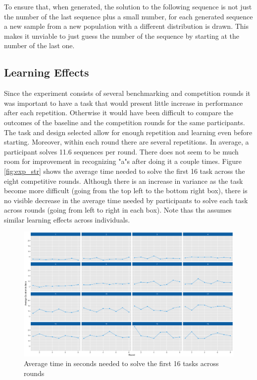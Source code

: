     To ensure that, when generated, the solution to the following sequence is not just the number of the last sequence plus a small number, for each generated sequence a new sample from a new population with a different distribution is drawn. This makes it unviable to just guess the number of the sequence by starting at the number of the last one.
    
        
    \subsection{Learning Effects}
    Since the experiment consists of several benchmarking and competition rounds it was important to have a task that would present little increase in performance after each repetition. Otherwise it would have been difficult to compare the outcomes of the baseline and the competition rounds for the same participants.\\
    
    The task and design selected allow for enough repetition and learning even before starting. Moreover, within each round there are several repetitions. In average, a participant solves 11.6 sequences per round. There does not seem to be much room for improvement in recognizing "a"s after doing it a couple times. Figure \ref{fig:exp_str} shows the average time needed to solve the first 16 task across the eight competitive rounds. Although there is an increase in variance as the task become more difficult (going from the top left to the bottom right box), there is no visible decrease in the average time needed by participants to solve each task across rounds (going from left to right in each box). Note thas ths assumes similar learning effects across individuals.
    
    \begin{figure}[h]
        \centering
        \includegraphics[width=\textwidth]{graphs/avg_time_per_task_round.png}
        \caption{Average time in seconds needed to solve the first 16 tasks across rounds}
        \label{fig:avg_time_task}
    \end{figure}
    
